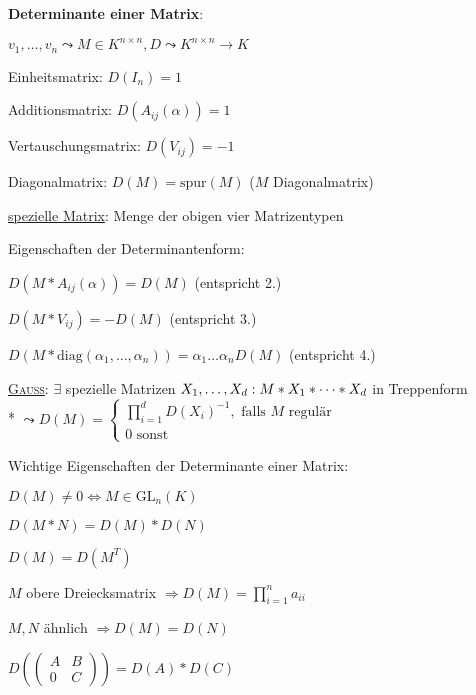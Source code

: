 \textbf{Determinante einer Matrix}:
\begin{items}
	\item $v_1, \dots, v_n \leadsto M \in K^{n \times n}, D \leadsto K^{n \times n} \rightarrow K$
	\item Einheitsmatrix: $D(I_n) = 1$
	\item Additionsmatrix: $D(A_{ij}(\alpha)) = 1$
	\item Vertauschungsmatrix: $D(V_{ij}) = -1$
	\item Diagonalmatrix: $D(M) = \text{spur}(M)$ ($M$ Diagonalmatrix)
	\item \underline{spezielle Matrix}: Menge der obigen vier Matrizentypen
	\item Eigenschaften der Determinantenform:
	\begin{enumeration}
		\item $D(M*A_{ij}(\alpha)) = D(M)$ (entspricht 2.)
		\item $D(M*V_{ij}) = - D(M)$ (entspricht  3.)
		\item $D(M*\text{diag}(\alpha_1, \dots, \alpha_n))= \alpha_1 \dots \alpha_n D(M)$ (entspricht 4.)
	\end{enumeration}
	\item \underline{\textsc{Gauß}}: $\exists$ spezielle Matrizen $X_1, \dots, X_d: \\* M * X_1 * \cdots * X_d$ in Treppenform \\* $\leadsto D(M) = \begin{cases} \prod_{i=1}^d D(X_i)^{-1}, \text{ falls $M$ regulär} \\ 0 \text{ sonst} \end{cases}$
	\item Wichtige Eigenschaften der Determinante einer Matrix:
	\begin{enumeration}
		\item $D(M) \neq 0 \Leftrightarrow M \in \text{GL}_n(K)$
		\item $D(M*N)=D(M)*D(N)$
		\item $D(M)=D(M^T)$
		\item $M$ obere Dreiecksmatrix $\Rightarrow D(M)=\prod_{i=1}^n a_{ii}$
		\item $M, N$ ähnlich $\Rightarrow D(M)=D(N)$
		\item $D\left(\begin{pmatrix} A & B \\ 0 & C \end{pmatrix}\right) = D(A)*D(C)$
	\end{enumeration}
\end{items}

